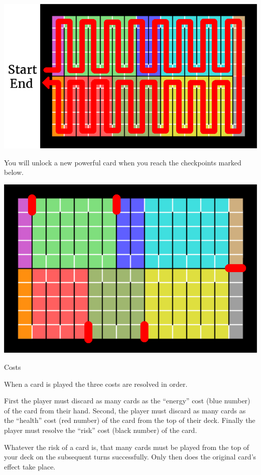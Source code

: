 \documentclass{article}
\begin{document}
{\centering\includegraphics{images/rules/board_order}\par}

You will unlock a new powerful card when you reach the checkpoints marked below.

{\centering\includegraphics{images/rules/checkpoints}\par}

\clearpage

{\noindent\Heading\Large Costs\par}

When a card is played the three costs are resolved in order.

First the player must discard as many cards as the ``energy'' cost
(blue number) of the card from their hand. Second, the player must discard as
many cards as the ``health'' cost (red number) of the card from the top of their
deck. Finally the player must resolve the ``risk'' cost (black number) of the
card.

Whatever the risk of a card is, that many cards must be played from the top of
your deck on the subsequent turns successfully. Only then does the original
card's effect take place.
\end{document}
